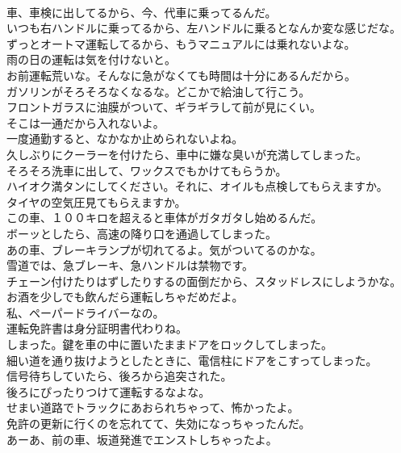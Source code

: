 \documentclass[8pt]{extreport}
\begin{document}
\begin{CJK}{UTF8}{min}
\\	車、車検に出してるから、今、代車に乗ってるんだ。	
\\	いつも右ハンドルに乗ってるから、左ハンドルに乗るとなんか変な感じだな。	
\\	ずっとオートマ運転してるから、もうマニュアルには乗れないよな。	
\\	雨の日の運転は気を付けないと。	
\\	お前運転荒いな。そんなに急がなくても時間は十分にあるんだから。	
\\	ガソリンがそろそろなくなるな。どこかで給油して行こう。	
\\	フロントガラスに油膜がついて、ギラギラして前が見にくい。	
\\	そこは一通だから入れないよ。	
\\	一度通勤すると、なかなか止められないよね。	
\\	久しぶりにクーラーを付けたら、車中に嫌な臭いが充満してしまった。	
\\	そろそろ洗車に出して、ワックスでもかけてもらうか。	
\\	ハイオク満タンにしてください。それに、オイルも点検してもらえますか。	
\\	タイヤの空気圧見てもらえますか。	
\\	この車、１００キロを超えると車体がガタガタし始めるんだ。	
\\	ボーッとしたら、高速の降り口を通過してしまった。	
\\	あの車、ブレーキランプが切れてるよ。気がついてるのかな。	
\\	雪道では、急ブレーキ、急ハンドルは禁物です。	
\\	チェーン付けたりはずしたりするの面倒だから、スタッドレスにしようかな。	
\\	お酒を少しでも飲んだら運転しちゃだめだよ。	
\\	私、ペーパードライバーなの。	
\\	運転免許書は身分証明書代わりね。	
\\	しまった。鍵を車の中に置いたままドアをロックしてしまった。	
\\	細い道を通り抜けようとしたときに、電信柱にドアをこすってしまった。	
\\	信号待ちしていたら、後ろから追突された。	
\\	後ろにぴったりつけて運転するなよな。	
\\	せまい道路でトラックにあおられちゃって、怖かったよ。	
\\	免許の更新に行くのを忘れてて、失効になっちゃったんだ。	
\\	あーあ、前の車、坂道発進でエンストしちゃったよ。	

\end{CJK}
\end{document}
